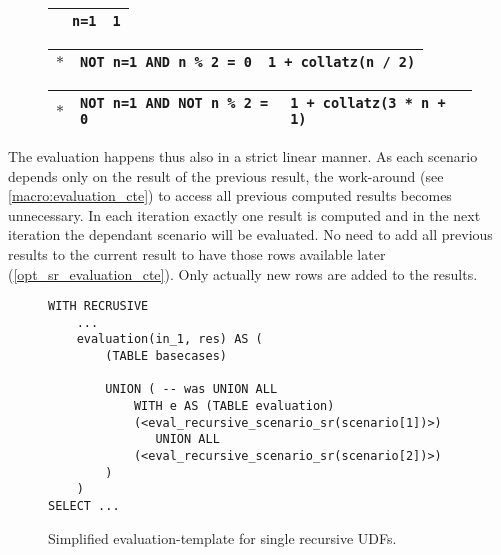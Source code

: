 \begin{figure}[h]
    \centering
    \begin{minipage}[b]{.45\linewidth}
    \centering
    \label{lst:collatz_udf}
    \end{minipage}
    \begin{minipage}[b]{.5\linewidth}
    \centering\scriptsize
        \begin{tabular}{|p{1em}|p{3.3cm}|p{2.9cm}|}\hline
        \cellcolor{gray!25} & \texttt{\phantom{NOT }n=1} & \texttt{1}\\\hline
        \end{tabular}
        
        \begin{tabular}{|p{1em}|p{3.3cm}|p{2.9cm}|}\hline
        \cellcolor{gray!25} $\ast$ & \texttt{NOT n=1 AND \phantom{NOT }n \% 2 = 0} & \texttt{1 + collatz(n / 2)}\\\hline
        \end{tabular}
        
        \begin{tabular}{|p{1em}|p{3.3cm}|p{2.9cm}|}\hline
        \cellcolor{gray!25} $\ast$ & \texttt{NOT n=1 AND NOT n \% 2 = 0} & \texttt{1 + collatz(3 * n + 1)}\\\hline
        \end{tabular}
        \vspace{2em}
    \label{collatz_scenarios}
    \end{minipage}
    \caption{}
    \label{collatz_sql_with_scenarios}
\end{figure}

The evaluation happens thus also in a strict linear manner. As each scenario depends only on the result of the previous result, the work-around (see \autoref{macro:evaluation_cte}) to access all previous computed results becomes unnecessary. In each iteration exactly one result is computed and in the next iteration the dependant scenario will be evaluated. No need to add all previous results to the current result to have those rows available later (\autoref{opt_sr_evaluation_cte}). Only actually new rows are added to the results.

\begin{figure}[h!]
    \centering
    \begin{verbatim}
WITH RECRUSIVE
    ...
    evaluation(in_1, res) AS (
        (TABLE basecases)
        
        UNION ( -- was UNION ALL
            WITH e AS (TABLE evaluation)
            (<eval_recursive_scenario_sr(scenario[1])>)
               UNION ALL
            (<eval_recursive_scenario_sr(scenario[2])>)
        )
    )
SELECT ...
    \end{verbatim}
    \caption{Simplified evaluation-template for single recursive UDFs.}
    \label{opt_sr_evaluation_cte}
\end{figure}

